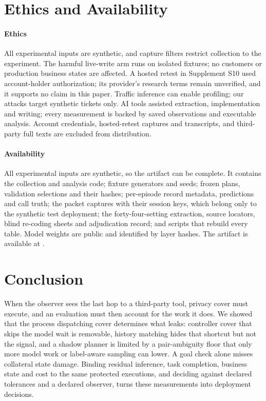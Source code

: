 \section{Ethics and Availability}\label{sec:validity}
\paragraph{Ethics}
All experimental inputs are synthetic, and capture filters restrict collection to the experiment. The harmful live-write arm runs on isolated fixtures; no customers or production business states are affected. A hosted retest in Supplement S10 used account-holder authorization; its provider's research terms remain unverified, and it supports no claim in this paper. Traffic inference can enable profiling; our attacks target synthetic tickets only. AI tools assisted extraction, implementation and writing; every measurement is backed by saved observations and executable analysis. Account credentials, hosted-retest captures and transcripts, and third-party full texts are excluded from distribution.

\paragraph{Availability}
All experimental inputs are synthetic, so the artifact can be complete. It contains the collection and analysis code; fixture generators and seeds; frozen plans, validation selections and their hashes; per-episode record metadata, predictions and call truth; the packet captures with their session keys, which belong only to the synthetic test deployment; the forty-four-setting extraction, source locators, blind re-coding sheets and adjudication record; and scripts that rebuild every table. Model weights are public and identified by layer hashes. The artifact is available at \artifacturl.

\section{Conclusion}
When the observer sees the last hop to a third-party tool, privacy cover must execute, and an evaluation must then account for the work it does. We showed that the process dispatching cover determines what leaks: controller cover that skips the model wait is removable, history matching hides that shortcut but not the signal, and a shadow planner is limited by a pair-ambiguity floor that only more model work or label-aware sampling can lower. A goal check alone misses collateral state damage. Binding residual inference, task completion, business state and cost to the same protected executions, and deciding against declared tolerances and a declared observer, turns these measurements into deployment decisions.
